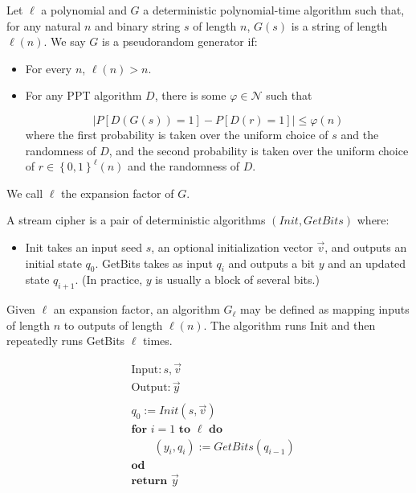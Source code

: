 \documentclass[a4paper, 12pt]{article}
\begin{document}
\begin{definition}
    Let $\ell$ a polynomial and $G$ a deterministic polynomial-time 
    algorithm such that, for any natural $n$ and binary string 
    $s$ of length $n$, $G(s)$ is a string of length $\ell(n)$.
    We say $G$ is a pseudorandom generator if: 

    \begin{itemize}
        \item For every $n$, $\ell(n) > n$.
        \item For any PPT algorithm $D$, there is some $\varphi \in \mathcal{N}$ such that 

            \begin{equation*}
                \left| P\left[ D\left( G(s) \right) = 1 \right] - P \left[ D(r) = 1 \right]   \right| \leq \varphi(n)
            \end{equation*}
        where the first probability is taken over the uniform choice 
        of $s$ and the randomness of $D$, and the second probability 
        is taken over the uniform choice of $r \in \left\{ 0, 1 \right\}^\ell(n) $ and the randomness of $D$.
    \end{itemize}

    We call $\ell$ the expansion factor of $G$.
\end{definition}

A stream cipher is a pair of deterministic algorithms $(Init, GetBits)$
where: 

\begin{itemize}
    \item Init takes an input seed $s$, an optional initialization vector
        $\overrightarrow{v}$, and outputs an initial state $q_0$.
    \init GetBits takes as input $q_i$ and outputs a bit $y$ and an updated 
    state $q_{i+1}$. (In practice, $y$ is usually a block of several bits.)
\end{itemize}

Given $\ell$ an expansion factor, an algorithm $G_\ell$ may be defined as
mapping inputs of length $n$ to outputs of length $\ell(n)$. The 
algorithm runs Init and then repeatedly runs GetBits $\ell$ times.

\begin{align*}
    &\text{Input}: s, \overrightarrow{v}\\ 
    &\text{Output}: \overrightarrow{y} \\ 
    &\\ 
    &q_0 := Init(s, \overrightarrow{v}) \\ 
    &\textbf{for } i = 1 \textbf{ to } \ell \textbf{ do } \\ 
    &\qquad (y_i, q_i) := GetBits(q_{i-1}) \\ 
    &\textbf{od} \\ 
    &\textbf{return } \overrightarrow{y}
\end{align*}
\end{document}
